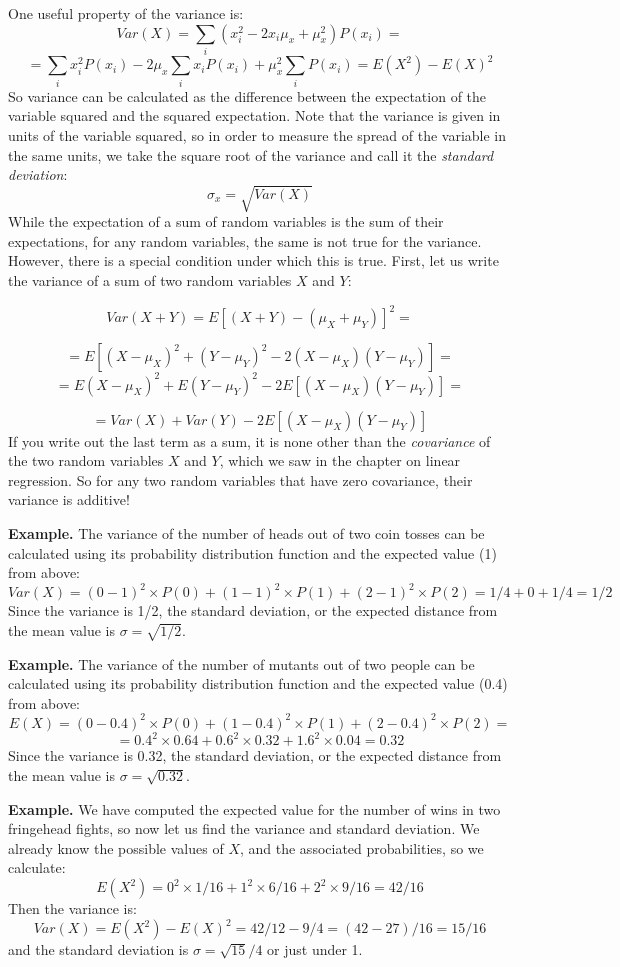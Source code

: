 \documentclass[
]{book}
\theoremstyle{definition}
\theoremstyle{definition}
\theoremstyle{definition}
\theoremstyle{remark}
\begin{document}
One useful property of the variance is:
\[ Var(X) = \sum_i (x_i^2 - 2x_i\mu_x + \mu_x^2)P(x_i) =\]
\[= \sum_i x_i^2 P(x_i) - 2\mu_x\sum_i x_i P(x_i) + \mu_x^2 \sum_i P(x_i) = E(X^2) - E(X)^2 \]
So variance can be calculated as the difference between the expectation of the variable squared and the squared expectation. Note that the variance is given in units of the variable squared, so in order to measure the spread of the variable in the same units, we take the square root of the variance and call it the \emph{standard deviation}:
\[\sigma_x = \sqrt{Var(X)}\]
While the expectation of a sum of random variables is the sum of their expectations, for any random variables, the same is not true for the variance. However, there is a special condition under which this is true. First, let us write the variance of a sum of two random variables \(X\) and \(Y\):

\[Var(X+Y) = E \left[ (X+Y)-(\mu_X+\mu_Y) \right]^2 =\]

\[ = E[ (X-\mu_X)^2 +(Y-\mu_Y)^2 - 2(X-\mu_X)(Y-\mu_Y)] = \]
\[=E (X-\mu_X)^2 +  E(Y-\mu_Y)^2   -2 E[(X-\mu_X)(Y-\mu_Y)] = \]

\[ = Var(X) + Var(Y)  -2 E[(X-\mu_X)(Y-\mu_Y)] \]
If you write out the last term as a sum, it is none other than the \emph{covariance} of the two random variables \(X\) and \(Y\), which we saw in the chapter on linear regression. So for any two random variables that have zero covariance, their variance is additive!

\textbf{Example.} The variance of the number of heads out of two coin tosses can be calculated using its probability distribution function and the expected value (1) from above:
\[ Var(X) = (0-1)^2 \times P(0) + (1-1)^2 \times P(1) + (2-1)^2 \times P(2) = 1/4+0+1/4 = 1/2\]
Since the variance is 1/2, the standard deviation, or the expected distance from the mean value is \(\sigma= \sqrt{1/2}\).

\textbf{Example.} The variance of the number of mutants out of two people can be calculated using its probability distribution function and the expected value (0.4) from above:
\[ E(X) = (0-0.4)^2 \times P(0) + (1-0.4)^2 \times P(1) + (2-0.4)^2 \times P(2) =\]
\[ = 0.4^2 \times 0.64+0.6^2 \times 0.32+1.6^2 \times 0.04 = 0.32\]
Since the variance is 0.32, the standard deviation, or the expected distance from the mean value is \(\sigma= \sqrt{0.32}\).

\textbf{Example.} We have computed the expected value for the number of wins in two fringehead fights, so now let us find the variance and standard deviation. We already know the possible values of \(X\), and the associated probabilities, so we calculate:
\[ E(X^2) = 0^2 \times 1/16 + 1^2 \times 6/16 + 2^2 \times 9/16 = 42/16\]
Then the variance is:
\[ Var(X) = E(X^2)  - E(X)^2 = 42/12 - 9/4 = (42-27)/16 = 15/16\]
and the standard deviation is \(\sigma = \sqrt{15}/4\) or just under 1.
\end{document}
